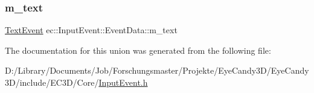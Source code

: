 \mbox{\label{unionec_1_1_input_event_1_1_event_data_acd584a87f8886a1df789e075949f8f54}} 
\subsubsection{\texorpdfstring{m\+\_\+text}{m\_text}}
{\footnotesize\ttfamily \mbox{\hyperlink{structec_1_1_text_event}{Text\+Event}} ec\+::\+Input\+Event\+::\+Event\+Data\+::m\+\_\+text}



The documentation for this union was generated from the following file\+:\begin{DoxyCompactItemize}
\item 
D\+:/\+Library/\+Documents/\+Job/\+Forschungsmaster/\+Projekte/\+Eye\+Candy3\+D/\+Eye\+Candy3\+D/include/\+E\+C3\+D/\+Core/\mbox{\hyperlink{_input_event_8h}{Input\+Event.\+h}}\end{DoxyCompactItemize}
